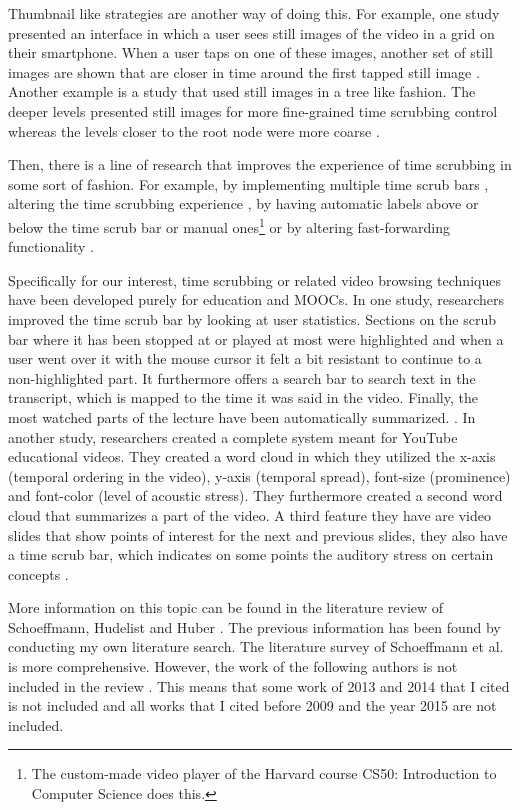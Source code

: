 Thumbnail like strategies are another way of doing this. For example, one study presented an interface in which a user sees still images of the video in a grid on their smartphone. When a user taps on one of these images, another set of still images are shown that are closer in time around the first tapped still image \cite{hi_story2012}. Another example is a study that used still images in a tree like fashion. The deeper levels presented still images for more fine-grained time scrubbing control whereas the levels closer to the root node were more coarse \cite{videotree2010}.

Then, there is a line of research that improves the experience of time scrubbing in some sort of fashion. For example, by implementing multiple time scrub bars \cite{multipletimeline1999}, altering the time scrubbing experience \cite{dynamictime2010}, by having automatic labels above or below the time scrub bar \cite{automaticsection2015} or manual ones\footnote{The custom-made video player of the Harvard course CS50: Introduction to Computer Science does this.} or by altering fast-forwarding functionality \cite{fastforward2009}.

Specifically for our interest, time scrubbing or related video browsing techniques have been developed purely for education and MOOCs. In one study, researchers improved the time scrub bar by looking at user statistics. Sections on the scrub bar where it has been stopped at or played at most were highlighted and when a user went over it with the mouse cursor it felt a bit resistant to continue to a non-highlighted part. It furthermore offers a search bar to search text in the transcript, which is mapped to the time it was said in the video. Finally, the most watched parts of the lecture have been automatically summarized. \cite{kim2014}. In another study, researchers created a complete system meant for YouTube educational videos. They created a word cloud in which they utilized the x-axis (temporal ordering in the video), y-axis (temporal spread), font-size (prominence) and font-color (level of acoustic stress). They furthermore created a second word cloud that summarizes a part of the video. A third feature they have are video slides that show points of interest for the next and previous slides, they also have a time scrub bar, which indicates on some points the auditory stress on certain concepts \cite{yadav2015}.

More information on this topic can be found in the literature review of Schoeffmann, Hudelist and Huber \cite{schoeffmann2015}. The previous information has been found by conducting my own literature search. The literature survey of Schoeffmann et al. is more comprehensive. However, the work of the following authors is not included in the review \cite{shah2013, goldman2008, dragicevic2008, kimber2007, multipletimeline1999, automaticsection2015, fastforward2009, kim2014, yadav2015}. This means that some work of 2013 and 2014 that I cited is not included and all works that I cited before 2009 and the year 2015 are not included. 


